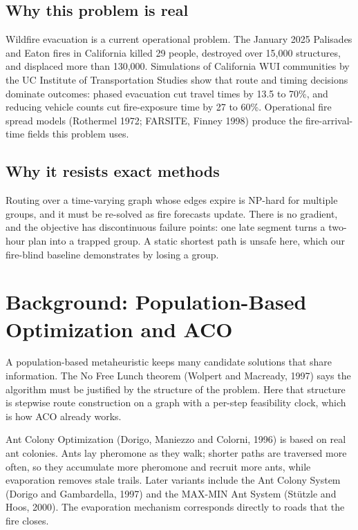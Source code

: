 \documentclass[11pt,a4paper]{article}
\begin{document}
\subsection{Why this problem is real}
Wildfire evacuation is a current operational problem. The January 2025 Palisades and Eaton fires in California killed 29 people, destroyed over 15{,}000 structures, and displaced more than 130{,}000. Simulations of California WUI communities by the UC Institute of Transportation Studies show that route and timing decisions dominate outcomes: phased evacuation cut travel times by 13.5 to 70\%, and reducing vehicle counts cut fire-exposure time by 27 to 60\%. Operational fire spread models (Rothermel 1972; FARSITE, Finney 1998) produce the fire-arrival-time fields this problem uses.

\subsection{Why it resists exact methods}
Routing over a time-varying graph whose edges expire is NP-hard for multiple groups, and it must be re-solved as fire forecasts update. There is no gradient, and the objective has discontinuous failure points: one late segment turns a two-hour plan into a trapped group. A static shortest path is unsafe here, which our fire-blind baseline demonstrates by losing a group.

\section{Background: Population-Based Optimization and ACO}

A population-based metaheuristic keeps many candidate solutions that share information. The No Free Lunch theorem (Wolpert and Macready, 1997) says the algorithm must be justified by the structure of the problem. Here that structure is stepwise route construction on a graph with a per-step feasibility clock, which is how ACO already works.

Ant Colony Optimization (Dorigo, Maniezzo and Colorni, 1996) is based on real ant colonies. Ants lay pheromone as they walk; shorter paths are traversed more often, so they accumulate more pheromone and recruit more ants, while evaporation removes stale trails. Later variants include the Ant Colony System (Dorigo and Gambardella, 1997) and the MAX-MIN Ant System (St\"utzle and Hoos, 2000). The evaporation mechanism corresponds directly to roads that the fire closes.
\end{document}
